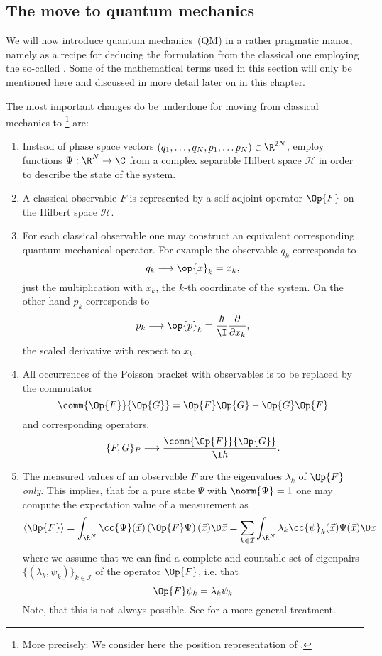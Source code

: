 \subsection{The move to quantum mechanics}
\defineabbr{QM}{QM\xspace}{quantum mechanics}
We will now introduce quantum mechanics~(QM) in a rather pragmatic manor,
namely as a recipe for deducing the \QM formulation
from the classical one
employing the so-called .
Some of the mathematical terms used in this section
will only be mentioned here and discussed in more detail
later on in this chapter.

The most important changes do be underdone for
moving from classical mechanics to \QM%
\footnote{More precisely: We consider here the position representation of \QM.}
are:
\begin{enumerate}
	\item Instead of phase space vectors $\clphase \in \R^{2N}$,
		employ functions $\Psi : \R^N \to \C$ from a
		complex separable Hilbert space $\mathcal{H}$
		in order to describe the state of the system.
	\item A classical observable $F$ is represented by a
		self-adjoint operator $\Op{F}$ on the Hilbert space $\mathcal{H}$.
	\item For each classical observable one may construct an equivalent
		corresponding quantum-mechanical operator.
		For example the observable $q_k$ corresponds to
		\[ q_k \longrightarrow \op{x}_k = x_k, \]
		\ie just the multiplication with $x_k$,
		the $k$-th coordinate of the system.
		On the other hand $p_k$ corresponds to
		\[ p_k \longrightarrow \op{p}_k
			= \frac{\hbar}{\I} \frac{\partial}{\partial x_k}, \]
		the scaled derivative with respect to $x_k$.
	\item All occurrences of the Poisson bracket with observables
		is to be replaced by the commutator
		\begin{equation}
			\comm{\Op{F}}{\Op{G}} = \Op{F} \Op{G} - \Op{G} \Op{F}
			\label{eqn:Operator}
		\end{equation}
		and corresponding operators, \ie
		\[ \{F, G\}_P \longrightarrow \frac{\comm{\Op{F}}{\Op{G}}}{\I \hbar}. \]
	\item The measured values of an observable $F$
		are the eigenvalues $\lambda_k$ of $\Op{F}$ \emph{only}.
		This implies, that for a pure state $\Psi$ with $\norm{\Psi} = 1$
		one may compute the expectation value of a measurement as
		\[ \langle \Op{F} \rangle = \int_{\R^N} \cc{\Psi}(\vec{x}) \left(\Op{F} \Psi\right)(\vec{x}) \D \vec{x} = \sum_{k\in\mathcal{I}} \int_{\R^N} \lambda_k \cc{\psi}_k(\vec{x}) \Psi(\vec{x}) \D x \]
		where we assume that we can find a complete and countable set
		of eigenpairs $\{ (\lambda_k, \psi_k) \}_{k \in \mathcal{I}}$
		of the operator $\Op{F}$, i.e. that
		\[ \Op{F} \psi_k = \lambda_k \psi_k \]
		Note, that this is not always possible.
		See \cite{Helffer2013} for a more general treatment.
\end{enumerate}
